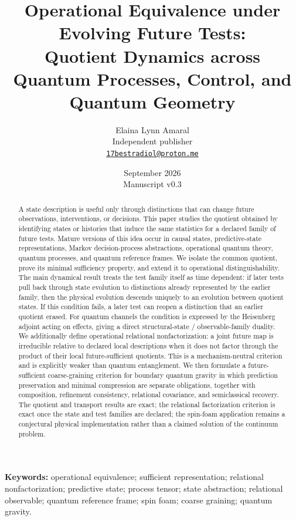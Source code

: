 \documentclass[11pt]{article}
\title{\bfseries Operational Equivalence under Evolving Future Tests:\\
Quotient Dynamics across Quantum Processes, Control, and Quantum Geometry}
\author{Elaina Lynn Amaral\\
\small Independent publisher\\
\small \href{mailto:17bestradiol@proton.me}{\nolinkurl{17bestradiol@proton.me}}}
\date{September 2026\\[1mm]\small Manuscript v0.3}
\begin{document}
\maketitle

\begin{abstract}
A state description is useful only through distinctions that can change future observations, interventions, or decisions. This paper studies the quotient obtained by identifying states or histories that induce the same statistics for a declared family of future tests. Mature versions of this idea occur in causal states, predictive-state representations, Markov decision-process abstractions, operational quantum theory, quantum processes, and quantum reference frames. We isolate the common quotient, prove its minimal sufficiency property, and extend it to operational distinguishability. The main dynamical result treats the test family itself as time dependent: if later tests pull back through state evolution to distinctions already represented by the earlier family, then the physical evolution descends uniquely to an evolution between quotient states. If this condition fails, a later test can reopen a distinction that an earlier quotient erased. For quantum channels the condition is expressed by the Heisenberg adjoint acting on effects, giving a direct structural-state / observable-family duality. We additionally define operational relational nonfactorization: a joint future map is irreducible relative to declared local descriptions when it does not factor through the product of their local future-sufficient quotients. This is a mechanism-neutral criterion and is explicitly weaker than quantum entanglement. We then formulate a future-sufficient coarse-graining criterion for boundary quantum gravity in which prediction preservation and minimal compression are separate obligations, together with composition, refinement consistency, relational covariance, and semiclassical recovery. The quotient and transport results are exact; the relational factorization criterion is exact once the state and test families are declared; the spin-foam application remains a conjectural physical implementation rather than a claimed solution of the continuum problem.
\end{abstract}

\noindent\textbf{Keywords:} operational equivalence; sufficient representation; relational nonfactorization; predictive state; process tensor; state abstraction; relational observable; quantum reference frame; spin foam; coarse graining; quantum gravity.
\end{document}
